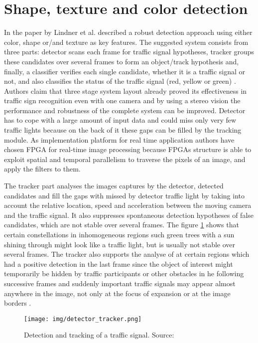 \documentclass[letterpaper, 10 pt, conference]{ieeeconf} %
\begin{document}

\section{Shape, texture and color detection}
 
In the paper by Lindner et al. described a robust detection approach using either color, shape or/and texture as key features. The suggested system consists from three parts: detector scans each frame for traffic signal hypotheses, tracker groups these candidates over several frames to form an object/track hypothesis and, finally, a classifier verifies each single candidate, whether it is a traffic signal or not, and also classifies the status of the traffic signal (red, yellow or green) \cite{c6}. Authors claim that three stage system layout already proved its effectiveness in traffic sign recognition even with one camera and by using a stereo vision the performance and robustness of the complete system can be improved. Detector has to cope with a large amount of input data and could miss only very few traffic lights because on the back of it these gaps can be filled by the tracking module. As implementation platform for real time application authors have chosen FPGA for real-time image processing because FPGAs structure is able to exploit spatial and temporal parallelism to traverse the pixels of an image, and apply the filters to them.

The tracker part analyses the images captures by the detector, detected candidates and fill the gaps with missed by detector traffic light by taking into account the relative location, speed and acceleration between the moving camera and the traffic signal. It also suppresses spontaneous detection hypotheses of false candidates, which are not stable over several frames. The figure \ref{dettrack} shows that certain constellations in inhomogeneous regions such green trees with a sun shining through might look like a traffic light, but is usually not stable over several frames. The tracker also supports the analyse of at certain regions which had a positive detection in the last frame since the object of interest might temporarily be hidden by traffic participants or other obstacles in he following successive frames and suddenly important traffic signals may appear almost anywhere in the image, not only at the focus of expansion or at the image borders \cite{c6}.

\begin{figure}[thpb]
	\centering
	\texttt{[image: img/detector\_tracker.png]}
	\caption{Detection and tracking of a traffic signal. Source: \cite{c6}}
	\label{dettrack}
\end{figure}
\end{document}
